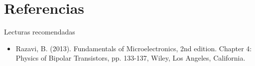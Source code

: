 \documentclass[t,aspectratio=169]{beamer}
\begin{document}
\section{Referencias}
\begin{frame}{Lecturas recomendadas}

\begin{itemize}
    \item Razavi, B. (2013). Fundamentals of Microelectronics, 2nd edition. Chapter 4: Physics of Bipolar Transistors, pp. 133-137, Wiley, Los Angeles, California.
\end{itemize}
    
\end{frame}
\end{document}
